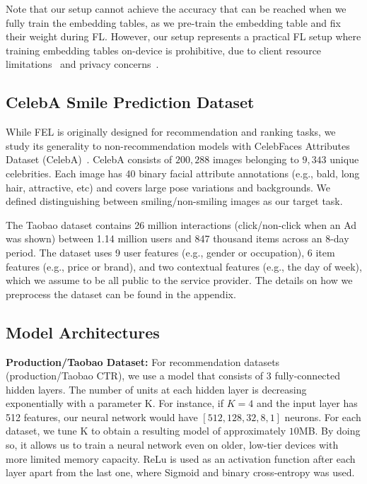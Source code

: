 Note that our setup cannot achieve the accuracy that can be reached when we fully train the embedding tables, as we pre-train the embedding table and fix their weight during FL.
However, our setup represents a practical FL setup where training embedding tables on-device is prohibitive, due to client resource limitations~\cite{nguyen2021federated} and privacy concerns~\cite{alibaba_fl}.




\subsection{CelebA Smile Prediction Dataset}
While FEL is originally designed for recommendation and ranking tasks, we study its generality to non-recommendation models with CelebFaces Attributes Dataset (CelebA)~\cite{liu2015deep}. CelebA consists of $200,288$ images belonging to $9,343$ unique celebrities. Each image has 40 binary facial attribute annotations (e.g., bald, long hair, attractive, etc) and covers large pose variations and backgrounds.
We defined distinguishing between smiling/non-smiling images as our target task.

The Taobao dataset contains 26 million interactions (click/non-click when an Ad was shown) between 1.14 million users and 847 thousand items across an 8-day period. 
The dataset uses 9 user features (e.g., gender or occupation), 6 item features (e.g., price or brand), and two contextual features (e.g., the day of week), which we assume to be all public to the service provider. The details on how we preprocess the  dataset can be found in the appendix. 




\subsection{Model Architectures}
{\bf Production/Taobao Dataset:}
For recommendation datasets (production/Taobao CTR), we use a model that consists of 3 fully-connected hidden layers. The number of units at each hidden layer is decreasing exponentially with a parameter K. For instance, if $K=4$ and the input layer has 512 features, our neural network would have  $[512, 128, 32, 8, 1]$ neurons. For each dataset, we tune K to obtain a resulting model of approximately $10$MB. By doing so, it allows us to train a neural network even on older, low-tier devices with more limited memory capacity. ReLu is used as an activation function after each layer apart from the last one, where Sigmoid and binary cross-entropy was used.

